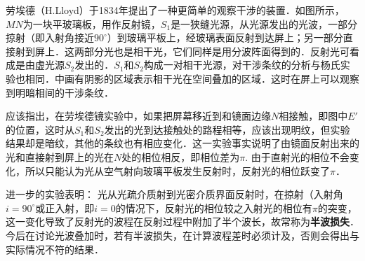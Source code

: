 
劳埃德（H.Lloyd）于1834年提出了一种更简单的观察干涉的装置．如图所示，$MN $为一块平玻璃板，用作反射镜，$S_1$是一狭缝光源，从光源发出的光波，一部分掠射（即入射角接近$90^\circ$）到玻璃平板上，经玻璃表面反射到达屏上；另一部分直接射到屏上．这两部分光也是相干光，它们同样是用分波阵面得到的．反射光可看成是由虚光源$S_2 $发出的．$S_1$和$S_2 $构成一对相干光源，对干涉条纹的分析与杨氏实验也相同．中画有阴影的区域表示相干光在空间叠加的区域．这时在屏上可以观察到明暗相间的干涉条纹．

应该指出，在劳埃德镜实验中，如果把屏幕移近到和镜面边缘$N $相接触，即图中$E' $的位置，这时从$S_1$和$S_2$发出的光到达接触处的路程相等，应该出现明纹，但实验结果却是暗纹，其他的条纹也有相应变化．这一实验事实说明了由镜面反射出来的光和直接射到屏上的光在$N $处的相位相反，即相位差为$\pi$. 由于直射光的相位不会变化，所以只能认为光从空气射向玻璃平板发生反射时，反射光的相位跃变了$\pi$．

进一步的实验表明： 光从光疏介质射到光密介质界面反射时，在掠射（入射角$i=90^\circ$或正入射，即$i = 0$的情况下，反射光的相位较之入射光的相位有$\pi$的突变，这一变化导致了反射光的波程在反射过程中附加了半个波长，故常称为\textbf{半波损失}．今后在讨论光波叠加时，若有半波损失，在计算波程差时必须计及，否则会得出与实际情况不符的结果．